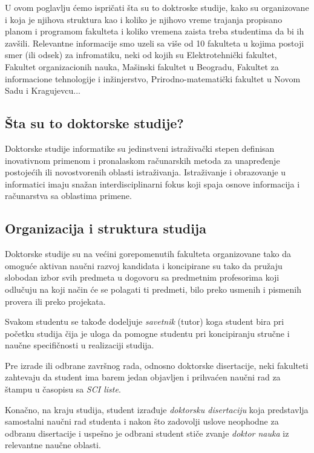 \documentclass[a4paper]{article}
\begin{document}
U ovom poglavlju ćemo ispričati šta su to doktroske studije, kako su organizovane i koja je njihova struktura kao i koliko je njihovo vreme trajanja propisano planom i programom fakulteta i koliko vremena zaista treba studentima da bi ih zavšili. Relevantne informacije smo uzeli sa više od 10 fakulteta u kojima postoji smer (ili odsek) za infromatiku, neki od kojih su Elektrotehnički fakultet, Fakultet organizacionih nauka, Mašinski fakultet u Beogradu, Fakultet za informacione tehnologije i inžinjerstvo, Prirodno-matematički fakultet u Novom Sadu i Kragujevcu\cite{fondoktorske, matfbgdoktorske, matfnsdoktorske, etfdoktorske}...

\subsection{Šta su to doktorske studije?}

Doktorske studije informatike su jedinstveni istraživački stepen definisan inovativnom primenom i pronalaskom računarskih metoda za unapređenje postojećih ili novostvorenih oblasti istraživanja. Istraživanje i obrazovanje u informatici imaju snažan interdisciplinarni fokus koji spaja osnove informacija i računarstva sa oblastima primene.



\subsection{Organizacija i struktura studija}

Doktorske studije su na većini gorepomenutih fakulteta organizovane tako da omoguće aktivan naučni razvoj kandidata i koncipirane su tako da pružaju slobodan izbor svih predmeta u dogovoru sa predmetnim profesorima koji odlučuju na koji način će se polagati ti predmeti, bilo preko usmenih i pismenih provera ili preko projekata. 

Svakom studentu se takođe dodeljuje \emph{savetnik} (tutor) koga student bira pri početku studija čija je uloga da pomogne studentu pri koncipiranju stručne i naučne specifičnosti u realizaciji studija. 

Pre izrade ili odbrane završnog rada, odnosno doktorske disertacije, neki fakulteti zahtevaju da student ima barem jedan objavljen i prihvaćen naučni rad za štampu u časopisu sa \emph{SCI liste}. 

Konačno, na kraju studija, student izrađuje \emph{doktorsku disertaciju} koja predstavlja samostalni naučni rad studenta i nakon što zadovolji uslove neophodne za odbranu disertacije i uspešno je odbrani student stiče zvanje \emph{doktor nauka} iz relevantne naučne oblasti.
\end{document}
